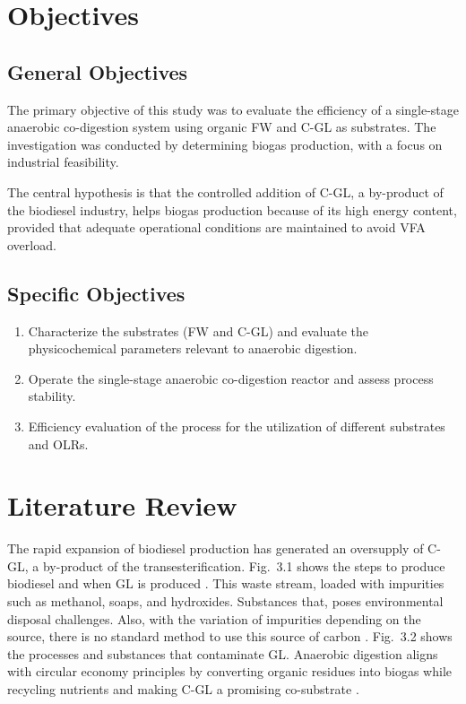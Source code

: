 \documentclass[12pt, a4paper, oneside]{report}
\begin{document}
\chapter{Objectives}

\section{General Objectives}

The primary objective of this study was to evaluate the efficiency of a single-stage anaerobic co-digestion system using organic FW and C-GL as substrates. The investigation was conducted by determining biogas production, with a focus on industrial feasibility.

The central hypothesis is that the controlled addition of C-GL, a by-product of the biodiesel industry, helps biogas production because of its high energy content, provided that adequate operational conditions are maintained to avoid VFA overload.

\section{Specific Objectives}

\begin{enumerate}
    \item Characterize the substrates (FW and C-GL) and evaluate the physicochemical parameters relevant to anaerobic digestion.
    \item Operate the single-stage anaerobic co-digestion reactor and assess process stability.
    \item Efficiency evaluation of the process for the utilization of different substrates and OLRs.
\end{enumerate}

\clearpage{}
\clearpage{}\chapter{Literature Review}

The rapid expansion of biodiesel production has generated an oversupply of C-GL, a by-product of the transesterification. Fig. 3.1 shows the steps to produce biodiesel and when GL is produced \parencite{garlapati2016}. This waste stream, loaded with impurities such as methanol, soaps, and hydroxides. Substances that, poses environmental disposal challenges. Also, with the variation of impurities depending on the source, there is no standard method to use this source of carbon \parencite{anand2012, gebreegziabher2025}. Fig. 3.2 shows the processes and substances that contaminate GL. Anaerobic digestion aligns with circular economy principles by converting organic residues into biogas while recycling nutrients and making C-GL a promising co-substrate \parencite{gebreegziabher2025}.
\end{document}

